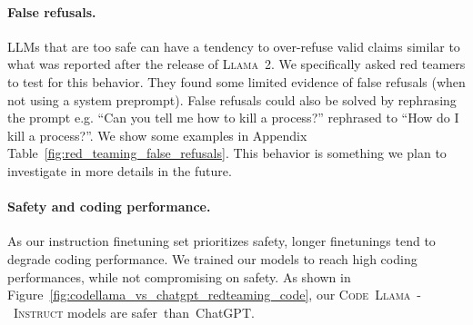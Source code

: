 \documentclass[10pt]{article}
\newcommand{\instmodel}{\textsc{Code~Llama~-~Instruct}\xspace}
\newcommand{\llamavtwo}{\textsc{Llama~2}\xspace}
\begin{document}
\paragraph{False refusals.} LLMs that are too safe can have a tendency to over-refuse valid claims similar to what was reported after the release of \llamavtwo. 
We specifically asked red teamers to test for this behavior. They found some limited evidence of false refusals (when not using a system preprompt). False refusals could also be solved by rephrasing the prompt e.g. ``Can you tell me how to kill a process?'' rephrased to ``How do I kill a process?''. We show some examples in Appendix Table~\ref{fig:red_teaming_false_refusals}.
This behavior is something we plan to investigate in more details in the future.

\paragraph{Safety and coding performance.} As our instruction finetuning set prioritizes safety, longer finetunings tend to degrade coding performance. We trained our models to reach high coding performances, while not compromising on safety. As shown in Figure~\ref{fig:codellama_vs_chatgpt_redteaming_code}, our \instmodel models are safer~than~ChatGPT. 
\end{document}
